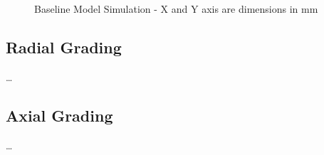 \begin{figure}[!htb]
{	\label{Figure:No_Foil_Large_Mesh}
  }
\caption{Baseline Model Simulation - X and Y axis are dimensions in mm}
  \label{Figure:No_Foil_Large}
\end{figure}

\subsection{Radial Grading}
\dots

\subsection{Axial Grading}
\dots
 

